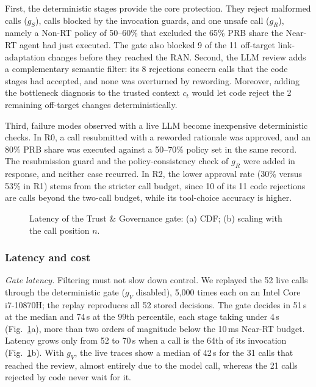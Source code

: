 \documentclass[conference]{IEEEtran}
\begin{document}
First, the deterministic stages provide the core protection. They reject
malformed calls ($g_S$), calls blocked by the invocation guards, and one unsafe
call ($g_R$), namely a Non-RT policy of 50--60\% that excluded the 65\% PRB share
the Near-RT agent had just executed. The gate also blocked 9 of the 11
off-target link-adaptation changes before they reached the RAN. Second, the LLM review adds a complementary semantic filter: its 8 rejections
concern calls that the code stages had accepted, and none was overturned by
rewording. Moreover, adding the bottleneck diagnosis to the trusted context
$c_t$ would let code reject the 2 remaining off-target changes
deterministically.

Third, failure modes observed with a live LLM become inexpensive deterministic
checks. In R0, a call resubmitted with a reworded rationale was approved, and an
80\% PRB share was executed against a 50--70\% policy set in the same record.
The resubmission guard and the policy-consistency check of $g_R$ were added in
response, and neither case recurred. In R2, the lower approval rate (30\% versus
53\% in R1) stems from the stricter call budget, since 10 of its 11 code
rejections are calls beyond the two-call budget, while its tool-choice accuracy
is higher.

\begin{figure}[!t]
\centering
\hspace{-2cm}
\caption{Latency of the Trust \& Governance gate: (a) CDF; (b) scaling with the
call position $n$.}
\label{fig:latency}
\end{figure}

\subsubsection{Latency and cost}
\emph{Gate latency.} Filtering must not slow down control. We replayed the 52 live calls through the deterministic gate ($g_V$ disabled), 5{,}000 times each on an Intel Core i7-10870H; the replay reproduces all 52 stored decisions. The
gate decides in 51\,\textmu s at the median and 74\,\textmu s at the 99th percentile, each stage taking under 4\,\textmu s (Fig.~\ref{fig:latency}a), more
than two orders of magnitude below the 10\,ms Near-RT budget. Latency grows only from 52 to 70\,\textmu s when a call is the 64th of its invocation (Fig.~\ref{fig:latency}b). With $g_V$, the live traces show a median of 42\,s for the 31 calls that reached the review, almost entirely due to the model call,
whereas the 21 calls rejected by code never wait for it. %
\end{document}
